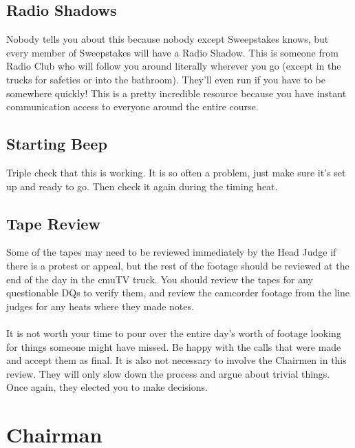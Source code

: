 \subsection{Radio Shadows}
Nobody tells you about this because nobody except Sweepstakes knows, but
every member of Sweepstakes will have a Radio Shadow. This is someone from
Radio Club who will follow you around literally wherever you go (except in the
trucks for safeties or into the bathroom). They'll even run if you have to
be somewhere quickly! This is a pretty incredible resource because you have
instant communication access to everyone around the entire course.

\subsection{Starting Beep}
Triple check that this is working. It is so often a problem, just make sure
it's set up and ready to go. Then check it again during the timing heat.

\subsection{Tape Review}
Some of the tapes may need to be reviewed immediately by the Head Judge if
there is a protest or appeal, but the rest of the footage should be reviewed
at the end of the day in the cmuTV truck. You should review the tapes for
any questionable DQs to verify them, and review the camcorder footage from the
line judges for any heats where they made notes.
\\\\
It is not worth your time to pour over the entire day's worth of footage
looking for things someone might have missed. Be happy with the calls that
were made and accept them as final. It is also not necessary to involve the
Chairmen in this review. They will only slow down the process and argue about
trivial things. Once again, they elected you to make decisions.

\section{Chairman}
